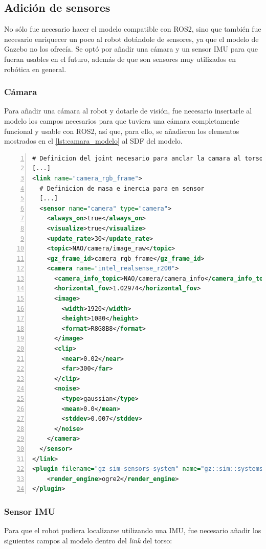 \subsection{Adición de sensores}

No sólo fue necesario hacer el modelo compatible con ROS2, sino que también fue  necesario
enriquecer un poco al robot dotándole de sensores, ya que el modelo de Gazebo no los ofrecía. Se optó por añadir una cámara y un sensor IMU para que fueran usables en el futuro, además de que son sensores muy utilizados en robótica en general.

\subsubsection{Cámara}
Para añadir una cámara al robot y dotarle de visión, fue necesario insertarle al modelo los campos necesarios para que tuviera una cámara completamente funcional y usable con ROS2, así que, para ello, se añadieron los elementos mostrados en el \autoref{lst:camara_modelo} al SDF del modelo.

\begin{lstlisting}[language=XML, caption={Adición de la cámara al modelo}, label={lst:camara_modelo}, numbers=left, backgroundcolor=\color{gray!10}]   
# Definicion del joint necesario para anclar la camara al torso del robot
[...]
<link name="camera_rgb_frame">
  # Definicion de masa e inercia para en sensor
  [...]
  <sensor name="camera" type="camera">
    <always_on>true</always_on>
    <visualize>true</visualize>
    <update_rate>30</update_rate>
    <topic>NAO/camera/image_raw</topic>
    <gz_frame_id>camera_rgb_frame</gz_frame_id>
    <camera name="intel_realsense_r200">
      <camera_info_topic>NAO/camera/camera_info</camera_info_topic>
      <horizontal_fov>1.02974</horizontal_fov>
      <image>
        <width>1920</width>
        <height>1080</height>
        <format>R8G8B8</format>
      </image>
      <clip>
        <near>0.02</near>
        <far>300</far>
      </clip>
      <noise>
        <type>gaussian</type>
        <mean>0.0</mean>
        <stddev>0.007</stddev>
      </noise>
    </camera> 
  </sensor>
</link>
<plugin filename="gz-sim-sensors-system" name="gz::sim::systems::Sensors">
    <render_engine>ogre2</render_engine>
</plugin>
\end{lstlisting}

\subsubsection{Sensor IMU}
Para que el robot pudiera localizarse utilizando una IMU, fue necesario añadir los siguientes campos al modelo dentro del \textit{link} del torso:

